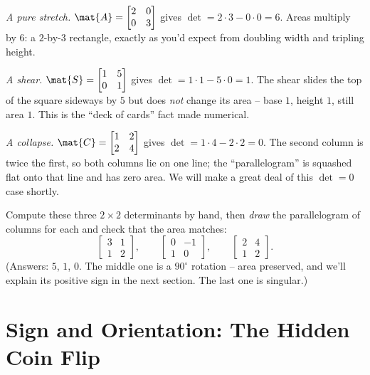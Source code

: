 \begin{example}
\label{ch21:ex-three-2x2}
\emph{A pure stretch.}
$\mat{A} = \begin{bmatrix} 2 & 0 \\ 0 & 3 \end{bmatrix}$ gives
$\det = 2\cdot 3 - 0\cdot 0 = 6$. Areas multiply by $6$: a $2$-by-$3$
rectangle, exactly as you'd expect from doubling width and tripling height.

\emph{A shear.}
$\mat{S} = \begin{bmatrix} 1 & 5 \\ 0 & 1 \end{bmatrix}$ gives
$\det = 1\cdot 1 - 5\cdot 0 = 1$. The shear slides the top of the square sideways
by $5$ but does \emph{not} change its area -- base $1$, height $1$, still area $1$.
This is the ``deck of cards'' fact made numerical.

\emph{A collapse.}
$\mat{C} = \begin{bmatrix} 1 & 2 \\ 2 & 4 \end{bmatrix}$ gives
$\det = 1\cdot 4 - 2\cdot 2 = 0$. The second column is twice the first, so both
columns lie on one line; the ``parallelogram'' is squashed flat onto that line and
has zero area. We will make a great deal of this $\det = 0$ case shortly.
\end{example}

\begin{labbox}
Compute these three $2\times 2$ determinants by hand, then \emph{draw} the
parallelogram of columns for each and check that the area matches:
\[
  \begin{bmatrix} 3 & 1 \\ 1 & 2 \end{bmatrix},\qquad
  \begin{bmatrix} 0 & -1 \\ 1 & 0 \end{bmatrix},\qquad
  \begin{bmatrix} 2 & 4 \\ 1 & 2 \end{bmatrix}.
\]
(Answers: $5$, $1$, $0$. The middle one is a $90^\circ$ rotation -- area
preserved, and we'll explain its positive sign in the next section. The last one
is singular.)
\end{labbox}

\section{Sign and Orientation: The Hidden Coin Flip}
\label{ch21:sign}

